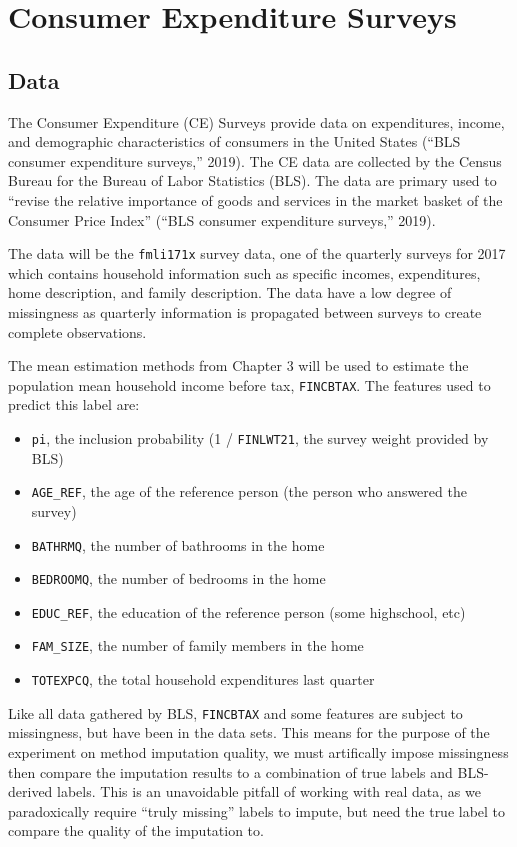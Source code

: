 \documentclass[12pt,twoside]{reedthesis}
\begin{document}
\chapter{Consumer Expenditure
Surveys}\label{consumer-expenditure-surveys}

\section{Data}\label{data}

The Consumer Expenditure (CE) Surveys provide data on expenditures,
income, and demographic characteristics of consumers in the United
States (``BLS consumer expenditure surveys,'' 2019). The CE data are
collected by the Census Bureau for the Bureau of Labor Statistics (BLS).
The data are primary used to ``revise the relative importance of goods
and services in the market basket of the Consumer Price Index'' (``BLS
consumer expenditure surveys,'' 2019).

The data will be the \texttt{fmli171x} survey data, one of the quarterly
surveys for 2017 which contains household information such as specific
incomes, expenditures, home description, and family description. The
data have a low degree of missingness as quarterly information is
propagated between surveys to create complete observations.

The mean estimation methods from Chapter 3 will be used to estimate the
population mean household income before tax, \texttt{FINCBTAX}. The
features used to predict this label are:
\begin{itemize}
\item
  \texttt{pi}, the inclusion probability (1 / \texttt{FINLWT21}, the
  survey weight provided by BLS)
\item
  \texttt{AGE\_REF}, the age of the reference person (the person who
  answered the survey)
\item
  \texttt{BATHRMQ}, the number of bathrooms in the home
\item
  \texttt{BEDROOMQ}, the number of bedrooms in the home
\item
  \texttt{EDUC\_REF}, the education of the reference person (some
  highschool, etc)
\item
  \texttt{FAM\_SIZE}, the number of family members in the home
\item
  \texttt{TOTEXPCQ}, the total household expenditures last quarter
\end{itemize}
Like all data gathered by BLS, \texttt{FINCBTAX} and some features are
subject to missingness, but have been in the data sets. This means for
the purpose of the experiment on method imputation quality, we must
artifically impose missingness then compare the imputation results to a
combination of true labels and BLS-derived labels. This is an
unavoidable pitfall of working with real data, as we paradoxically
require ``truly missing'' labels to impute, but need the true label to
compare the quality of the imputation to.
\end{document}
